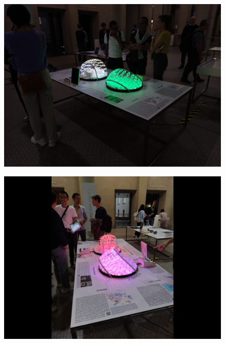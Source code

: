 \documentclass[a4paper,9pt]{article}
\begin{document}
    \hfill
    \begin{minipage}{0.48\linewidth}
         \begin{figure}[H]
        \centering
        \includegraphics[width=\linewidth]{Images/2.jpg}
    \end{figure}
\end{minipage}
\begin{minipage}{0.48\linewidth}
         \begin{figure}[H]
        \centering
        \includegraphics[width=\linewidth]{Images/3.jpg}
    \end{figure}
    \end{minipage}
\end{document}
